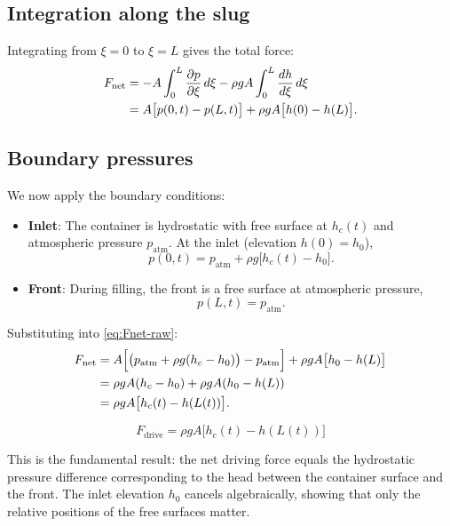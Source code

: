 \documentclass[11pt]{article}
\theoremstyle{definition}
\begin{document}
\subsection{Integration along the slug}

Integrating from $\xi = 0$ to $\xi = L$ gives the total force:
\begin{align}
  F_{\text{net}} &= -A \int_0^L \frac{\partial p}{\partial \xi}\,d\xi 
                   - \rho g A \int_0^L \frac{dh}{d\xi}\,d\xi \notag \\
                 &= A\bigl[p(0,t) - p(L,t)\bigr] + \rho g A\bigl[h(0) - h(L)\bigr].
  \label{eq:Fnet-raw}
\end{align}

\subsection{Boundary pressures}

We now apply the boundary conditions:
\begin{itemize}[nosep]
  \item \textbf{Inlet}: The container is hydrostatic with free surface at $h_c(t)$ and 
        atmospheric pressure $p_{\text{atm}}$. At the inlet (elevation $h(0) = h_0$),
        \[
          p(0,t) = p_{\text{atm}} + \rho g\bigl[h_c(t) - h_0\bigr].
        \]
  \item \textbf{Front}: During filling, the front is a free surface at atmospheric pressure,
        \[
          p(L,t) = p_{\text{atm}}.
        \]
\end{itemize}

Substituting into \eqref{eq:Fnet-raw}:
\begin{align}
  F_{\text{net}} &= A\Bigl[\bigl(p_{\text{atm}} + \rho g(h_c - h_0)\bigr) - p_{\text{atm}}\Bigr]
                   + \rho g A\bigl[h_0 - h(L)\bigr] \notag \\
                 &= \rho g A (h_c - h_0) + \rho g A (h_0 - h(L)) \notag \\
                 &= \rho g A \bigl[h_c(t) - h(L(t))\bigr].
  \label{eq:Fdrive}
\end{align}

\begin{equation}
  \boxed{F_{\text{drive}} = \rho g A \bigl[h_c(t) - h(L(t))\bigr]}
  \label{eq:Fdrive-box}
\end{equation}

This is the fundamental result: the net driving force equals the hydrostatic pressure 
difference corresponding to the head between the container surface and the front. The inlet 
elevation $h_0$ cancels algebraically, showing that only the relative positions of the 
free surfaces matter.
\end{document}
